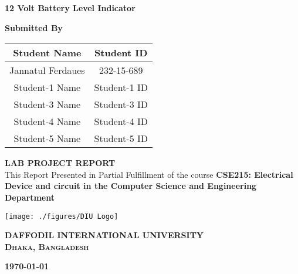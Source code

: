 \begin{titlepage}

\vspace*{2cm} %

\begin{center}
{\huge\bf 12 Volt Battery Level Indicator }
\end{center}

\vspace{2cm}

\begin{center}
\Large \bf Submitted By
\end{center}

\vspace{.1cm}

\begin{table}[h!]
\centering
\begin{tabular}{|c|c|}
\hline
\textbf{      Student Name      } & \textbf{  Student ID  } \\
\hline
 Jannatul Ferdaues & 232-15-689  \\
\hline
 Student-1 Name & Student-1 ID \\
\hline
Student-3 Name & Student-3 ID \\
\hline
Student-4 Name & Student-4 ID \\
\hline
Student-5 Name & Student-5 ID \\
\hline
\end{tabular}
\end{table}

\vspace{2cm}

\begin{center}
{\Large\bf LAB PROJECT REPORT}\\
\vspace{0.2cm}
\Large This Report Presented in Partial Fulfillment of the course  \textbf{CSE215:  Electrical Device and circuit in the Computer Science and Engineering Department}
\end{center}

\vspace{2cm}

\begin{center}
\texttt{[image: ./figures/DIU Logo]}
\end{center}

\begin{center}
	\Large\textbf{DAFFODIL INTERNATIONAL UNIVERSITY}\\
 \textbf{\textsc{Dhaka, Bangladesh}}
\end{center}

\begin{center}
\textbf{\today}
\end{center}

\end{titlepage}
